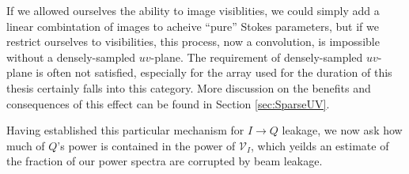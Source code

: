 If we allowed ourselves the ability to image visiblities, we could simply add a linear combintation
of images to acheive ``pure'' Stokes parameters, but if we restrict ourselves to visibilities, this
process, now a convolution, is impossible without a densely-sampled $uv$-plane. The requirement of
densely-sampled $uv$-plane is often not satisfied, especially for the array used for the duration of 
this thesis certainly falls into this category. More discussion on 
the benefits and consequences of this effect can be found in Section \ref{sec:SparseUV}.

Having established this particular mechanism for $I\to Q$ leakage, we now ask how much of $Q$'s power is
contained in the power of $\mathcal{V}_I$, which yeilds an estimate of the fraction of our power
spectra are corrupted by beam leakage.

